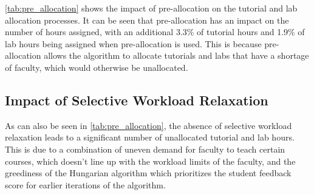 \autoref{tab:pre_allocation} shows the impact of pre-allocation on the tutorial and lab allocation processes. It can be seen that pre-allocation has an impact on the number of hours assigned, with an additional 3.3\% of tutorial hours and 1.9\% of lab hours being assigned when pre-allocation is used. This is because pre-allocation allows the algorithm to allocate tutorials and labs that have a shortage of faculty, which would otherwise be unallocated.

\subsection{Impact of Selective Workload Relaxation}

As can also be seen in \autoref{tab:pre_allocation}, the absence of selective workload relaxation leads to a significant number of unallocated tutorial and lab hours. This is due to a combination of uneven demand for faculty to teach certain courses, which doesn't line up with the workload limits of the faculty, and the greediness of the Hungarian algorithm which prioritizes the student feedback score for earlier iterations of the algorithm.

\begin{table}[H]
  \centering
  \caption{Allocation Results of Selective Workload Relaxation for Tutorials}
  \label{tab:dynamic_adjustment_tutorials}
\end{table}

